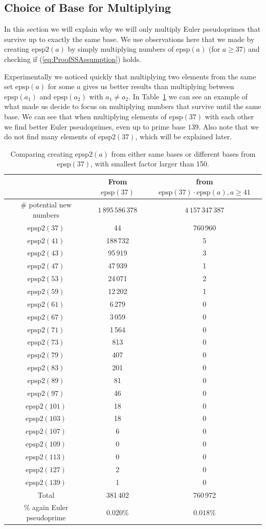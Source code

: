 \documentclass[runningheads]{amsart}
\newcommand{\epsp}{\mathrm{epsp}}
\begin{document}
\subsection{Choice of Base for Multiplying}\label{sec:choice_basis}
In this section we will explain why we will only multiply Euler pseudoprimes that
survive up to exactly the same base.
We use observations here that we made by creating
$\epsp2(a)$
by simply multiplying numbers of
$\epsp(a)$
(for $a
\geq
37)$ and checking if
(\ref{eq:ProofSSAssumption})
holds.

Experimentally we noticed quickly that multiplying two elements from the same set
$\epsp(a)$
for some $a$ gives us better results than multiplying between
$\epsp(a_1)$
and
$\epsp(a_2)$
with
$a_1
\neq
a_2$.
In
Table~\ref{tab:epsp_37}
we can see an example of what made us decide to focus on multiplying numbers that
survive until the same base.
We can see that when multiplying elements of
$\epsp(37)$
with each other we find better Euler pseudoprimes,
even up to prime base $139$.
Also note that we do not find many elements of
$\epsp2(37)$,
which will be explained later.

\begin{table}[]
\centering
\begin{tabular}{c|c|c}
&
From
$\epsp(37)$
&
from
$\epsp(37)
\cdot
\epsp(a),
a
\geq
41$
\\
\hline
$\#$
potential new numbers
&
$1\,895\,586\,378$&
$4\,157\,347\,387$\\
\hline
$\epsp2(37)$
&
44
&
760\,960\\
$\epsp2(41)$
&
188\,732
&
5
\\
$\epsp2(43)$
&
95\,919
&3
\\
$\epsp2(47)$
&47\,939
&
1\\
$\epsp2(53)$
&
24\,071
&2\\
$\epsp2(59)$
&12\,202
&1\\
$\epsp2(61)$
&
6\,279
&0\\
$\epsp2(67)$
&
3\,059&0\\
$\epsp2(71)$
&
1\,564&0\\
$\epsp2(73)$
&
813
&0\\
$\epsp2(79)$
&
407&0\\
$\epsp2(83)$
&
201
&0\\
$\epsp2(89)$
&
81
&0\\
$\epsp2(97)$
&
46
&0\\
$\epsp2(101)$
&
18
&0\\
$\epsp2(103)$
&
18
&0\\
$\epsp2(107)$
&
6
&0\\
$\epsp2(109)$
&
0
&0\\
$\epsp2(113)$
&
0
&0\\
$\epsp2(127)$
&
2
&0\\
$\epsp2(139)$
&
1
&0\\
\hline
Total
&381\,402
&
760\,972
\\
$\%$
again Euler pseudoprime
&
$0.020\%$
&
$0.018
\%$\\
\end{tabular}
\caption{Comparing creating $\epsp2(a)$ from either same bases or different bases from $\epsp(37)$, with smallest factor larger than 150.}
\label{tab:epsp_37}
\end{table}
\end{document}
